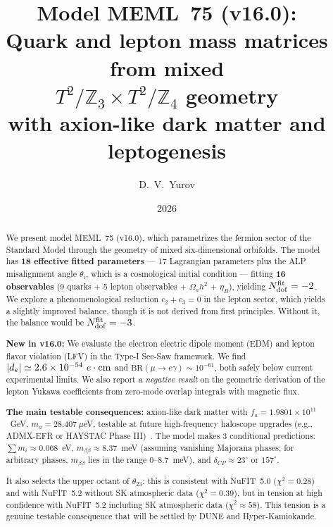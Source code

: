 \documentclass[12pt,a4paper]{article}
\title{\textbf{Model MEML~75 (v16.0):}\\[0.3cm]
\large Quark and lepton mass matrices from mixed \\
\(T^2/\mathbb{Z}_3 \times T^2/\mathbb{Z}_4\) geometry \\
with axion-like dark matter and leptogenesis}
\author{D.~V.~Yurov}
\date{2026}
\numberwithin{equation}{section}
\begin{document}
\maketitle

\begin{abstract}
\noindent
We present model MEML~75 (v16.0), which parametrizes the fermion sector of the Standard Model through the geometry of mixed six-dimensional orbifolds. The model has \textbf{18 effective fitted parameters} --- 17 Lagrangian parameters plus the ALP misalignment angle \(\theta_i\), which is a cosmological initial condition --- fitting \textbf{16 observables} (9 quarks + 5 lepton observables + \(\Omega_a h^2\) + \(\eta_B\)), yielding \(N_{\rm dof}^{\rm fit} = -2\). We explore a phenomenological reduction \(c_2 + c_3 = 0\) in the lepton sector, which yields a slightly improved balance, though it is not derived from first principles. Without it, the balance would be \(N_{\rm dof}^{\rm fit} = -3\).

\textbf{New in v16.0:} We evaluate the electron electric dipole moment (EDM) and lepton flavor violation (LFV) in the Type-I See-Saw framework. We find \(|d_e| \simeq 2.6 \times 10^{-54}~e\cdot{\rm cm}\) and \(\text{BR}(\mu \to e \gamma) \sim 10^{-61}\), both safely below current experimental limits. We also report a \emph{negative result} on the geometric derivation of the lepton Yukawa coefficients from zero-mode overlap integrals with magnetic flux.

\textbf{The main testable consequences:}
axion-like dark matter with \(f_a = 1.9801\times 10^{11}\)~GeV, \(m_a = 28.407~\mu\)eV, testable at future high-frequency haloscope upgrades (e.g., ADMX-EFR or HAYSTAC Phase III)~\cite{ADMX2018,HAYSTAC2021}. The model makes 3 conditional predictions: \(\sum m_i \approx 0.068\)~eV, \(m_{\beta\beta} \approx 8.37\)~meV (assuming vanishing Majorana phases; for arbitrary phases, \(m_{\beta\beta}\) lies in the range \(0\)--\(8.7\)~meV), and \(\delta_{CP} \approx 23^\circ\) or \(157^\circ\).

It also selects the upper octant of \(\theta_{23}\): this is consistent with NuFIT~5.0 (\(\chi^2 = 0.28\)) and with NuFIT~5.2 without SK atmospheric data (\(\chi^2 = 0.39\)), but in tension at high confidence with NuFIT~5.2 including SK atmospheric data (\(\chi^2 \approx 58\)). This tension is a genuine testable consequence that will be settled by DUNE and Hyper-Kamiokande.
\end{abstract}

\newpage
\end{document}
